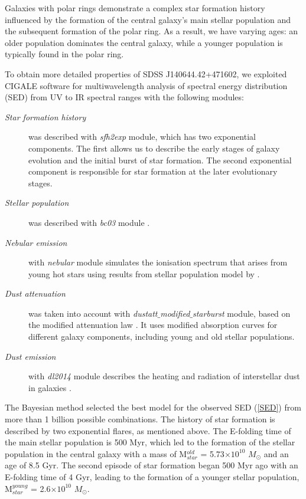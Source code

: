\documentclass{aa}
\begin{document}
Galaxies with polar rings demonstrate a complex star formation history influenced by the formation of the central galaxy's main stellar population and the subsequent formation of the polar ring. As a result, we have varying ages: an older population dominates the central galaxy, while a younger population is typically found in the polar ring.

To obtain more detailed properties of SDSS J140644.42+471602, we exploited CIGALE software \citep{Boquien2019} for multiwavelength analysis of spectral energy distribution (SED) from UV to IR spectral ranges with the following modules:
\begin{description}
   \item[\textit{Star formation history}] was described with \textit{sfh2exp} module, which has two exponential components. The first allows us to describe the early stages of galaxy evolution and the initial burst of star formation. The second exponential component is responsible for star formation at the later evolutionary stages. 
    \item[\textit{Stellar population}] was described with \textit{bc03} module \cite{Bruzual2003}. 
    \item[\textit{Nebular emission}] with \textit{nebular} module simulates the ionisation spectrum that arises from young hot stars using results from stellar population model by \cite{Inoue2011}. 
    \item[\textit{Dust attenuation}] was taken into account with \textit{dustatt$\_$modified$\_$starburst} module, based on the modified attenuation law \citep{Calzetti2000, Leitherer2002}.
    It uses modified absorption curves for different galaxy components, including young and old stellar populations. 
    \item[\textit{Dust emission}] with \textit{dl2014} module describes the heating and radiation of interstellar dust in galaxies \citep{Draine2014}.  
\end{description}
      
The Bayesian method selected the best model for the observed SED (\autoref{SED}) from more than 1 billion possible combinations. The history of star formation is described by two exponential flares, as mentioned above. The E-folding time of the main stellar population is 500 Myr, which led to the formation of the stellar population in the central galaxy with a mass of M$_{star}^{old}$ = 5.73$\times 10^{10}$ $M_{\odot}$ and an age of 8.5 Gyr. The second episode of star formation began 500 Myr ago with an E-folding time of 4 Gyr, leading to the formation of a younger stellar population, M$_{star}^{young}$ = 2.6$\times 10^{10}$ $M_{\odot}$. 
\end{document}
